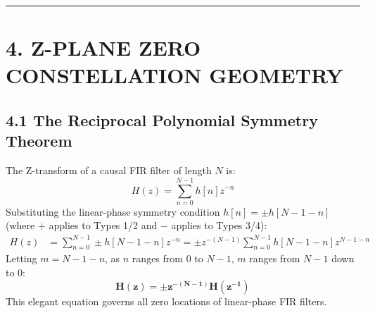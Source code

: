 \documentclass[11pt,a4paper]{article}
\begin{document}
\begin{table}[H]
\centering
\caption{Comprehensive Comparison of the Four Linear-Phase FIR Filter Types}
\label{tab:fir_types_audit}
\vspace{2mm}
\end{table}

\noindent\rule{\textwidth}{0.5pt}

\section{4. Z-PLANE ZERO CONSTELLATION GEOMETRY}

\subsection{4.1 The Reciprocal Polynomial Symmetry Theorem}
The Z-transform of a causal FIR filter of length $N$ is:
\begin{equation}
H(z) = \sum_{n=0}^{N-1} h[n] z^{-n}
\end{equation}
Substituting the linear-phase symmetry condition $h[n] = \pm h[N-1-n]$ (where $+$ applies to Types 1/2 and $-$ applies to Types 3/4):
\begin{align}
H(z) &= \sum_{n=0}^{N-1} \pm h[N-1-n] z^{-n} = \pm z^{-(N-1)} \sum_{n=0}^{N-1} h[N-1-n] z^{N-1-n}
\end{align}
Letting $m = N-1-n$, as $n$ ranges from $0$ to $N-1$, $m$ ranges from $N-1$ down to $0$:
\begin{equation}
\mathbf{H(z) = \pm z^{-(N-1)} H(z^{-1})}
\label{eq:reciprocal_poly}
\end{equation}
This elegant equation governs all zero locations of linear-phase FIR filters.
\end{document}
